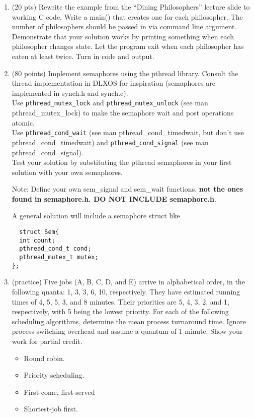 \documentclass[12pt]{article}
\begin{document}
\begin{enumerate}
  \vspace{-.1in}
  
\item (20 pts) Rewrite the example from the ``Dining Philosophers''
  lecture slide 
  to working C code. Write a main() that creates one
  for each philosopher. The number of philosophers should be passed in
  via command line argument. Demonstrate that your solution works by
  printing something when each philosopher changes state. Let the
  program exit when each philosopher has eaten at least twice. Turn in
  code and output. 
      
\item (80 points) Implement semaphores using the pthread
  library. Consult the thread implementation in DLXOS for inspiration
  (semaphores are implemented in synch.h and synch.c). \\Use
  \verb$pthread_mutex_lock$ and \verb$pthread_mutex_unlock$ (see man
  pthread\_mutex\_lock) to make the semaphore wait and post operations
  atomic. \\Use \verb$pthread_cond_wait$ (see man
  pthread\_cond\_timedwait, but don't use pthread\_cond\_timedwait) and
  \verb$pthread_cond_signal$ (see man pthread\_cond\_signal). \\Test
  your solution by substituting the pthread semaphores in your first
  solution with your own semaphores. 

  Note: Define your own sem\_signal and sem\_wait functions.
  \textbf{not the ones found in semaphore.h. DO NOT INCLUDE semaphore.h}.

  A general solution will include a semaphore struct like
\begin{verbatim}
  struct Sem{
  int count;
  pthread_cond_t cond;
  pthread_mutex_t mutex;
};
\end{verbatim}

\newpage

\item (practice) Five jobs (A, B, C, D, and E) arrive 
  in alphabetical order, in the following
  quanta: 1, 3, 3, 6, 10, respectively. They have
  estimated running times of 4, 5, 5, 3, and 8 
minutes. Their priorities are 5, 4, 3, 2, and 1, respectively, with 5
being the lowest priority.  For each of the
following scheduling 
algorithms, determine the mean process turnaround time. Ignore process
switching overhead and assume a quantum of 1 minute. Show your work for
partial credit. 
\begin{itemize}
\item Round robin.
\item Priority scheduling.
\item First-come, first-served
\item Shortest-job first.
\end{itemize}



\end{enumerate}
\end{document}
